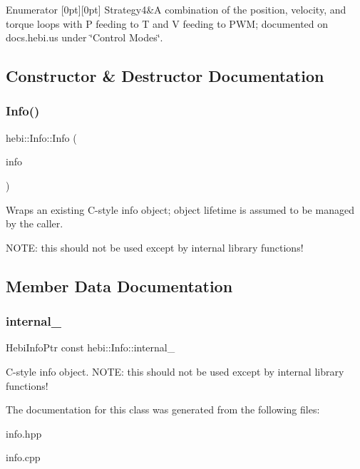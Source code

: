 \begin{DoxyEnumFields}{Enumerator}
[0pt][0pt]{}\mbox{\label{classhebi_1_1Info_a154026587295ad17a3e1460f32dab668ada6f37ba6cfbad3850a0e486f42664fd}} 
Strategy4&A combination of the position, velocity, and torque loops with P feeding to T and V feeding to P\+WM; documented on docs.\+hebi.\+us under \char`\"{}\+Control Modes\char`\"{}. \\
\hline

\end{DoxyEnumFields}


\subsection{Constructor \& Destructor Documentation}
\mbox{\label{classhebi_1_1Info_aa0b53c4d5b50d020197b10265e7d4040}} 
\subsubsection{\texorpdfstring{Info()}{Info()}}
{\footnotesize\ttfamily hebi\+::\+Info\+::\+Info (\begin{DoxyParamCaption}\item[{Hebi\+Info\+Ptr}]{info }\end{DoxyParamCaption})}



Wraps an existing C-\/style info object; object lifetime is assumed to be managed by the caller. 

N\+O\+TE\+: this should not be used except by internal library functions! 

\subsection{Member Data Documentation}
\mbox{\label{classhebi_1_1Info_aedc02a37757c7fcbd53a8069eeffcc73}} 
\subsubsection{\texorpdfstring{internal\+\_\+}{internal\_}}
{\footnotesize\ttfamily Hebi\+Info\+Ptr const hebi\+::\+Info\+::internal\+\_\+}

C-\/style info object. N\+O\+TE\+: this should not be used except by internal library functions! 

The documentation for this class was generated from the following files\+:\begin{DoxyCompactItemize}
\item 
info.\+hpp\item 
info.\+cpp\end{DoxyCompactItemize}
